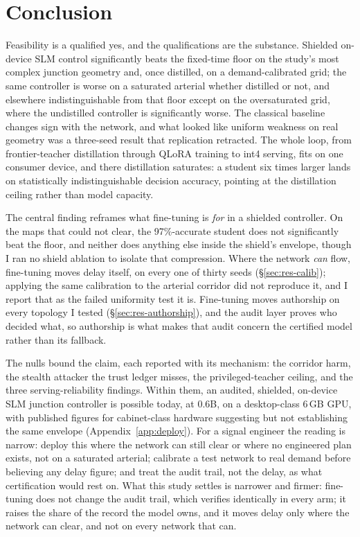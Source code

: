 \section{Conclusion}\label{ch:conclusion}

Feasibility is a qualified yes, and the qualifications are the substance.
Shielded on-device SLM control significantly beats the fixed-time floor on
the study's most complex junction geometry and, once distilled, on a
demand-calibrated grid; the same controller is worse on a saturated
arterial whether distilled or not, and elsewhere indistinguishable from
that floor except on the oversaturated grid, where the undistilled
controller is significantly worse. The classical baseline changes sign
with the network, and what looked like uniform weakness on real geometry
was a three-seed result that replication retracted. The whole loop, from
frontier-teacher distillation through QLoRA training to int4 serving, fits
on one consumer device, and there distillation saturates: a student six
times larger lands on statistically indistinguishable decision accuracy,
pointing at the distillation ceiling rather than model capacity.

The central finding reframes what fine-tuning is \emph{for} in a shielded
controller. On the maps that could not clear, the 97\%-accurate student
does not significantly beat the floor, and neither does anything else
inside the shield's envelope, though I ran no shield ablation to isolate
that compression. Where the network \emph{can} flow, fine-tuning moves
delay itself, on every one of thirty seeds (\S\ref{sec:res-calib});
applying the same calibration to the arterial corridor did not reproduce
it, and I report that as the failed uniformity test it is. Fine-tuning
moves authorship on every topology I tested (\S\ref{sec:res-authorship}),
and the audit layer proves who decided what, so authorship is what makes
that audit concern the certified model rather than its fallback.

The nulls bound the claim, each reported with its mechanism: the corridor
harm, the stealth attacker the trust ledger misses, the privileged-teacher
ceiling, and the three serving-reliability findings. Within them, an
audited, shielded, on-device SLM junction controller is possible today, at
0.6B, on a desktop-class 6\,GB GPU, with published figures for
cabinet-class hardware suggesting but not establishing the same envelope
(Appendix~\ref{app:deploy}). For a signal engineer the reading is narrow:
deploy this where the network can still clear or where no engineered plan
exists, not on a saturated arterial; calibrate a test network to real
demand before believing any delay figure; and treat the audit trail, not
the delay, as what certification would rest on. What this study settles is
narrower and firmer: fine-tuning does not change the audit trail, which
verifies identically in every arm; it raises the share of the record the
model owns, and it moves delay only where the network can clear, and not
on every network that can.
